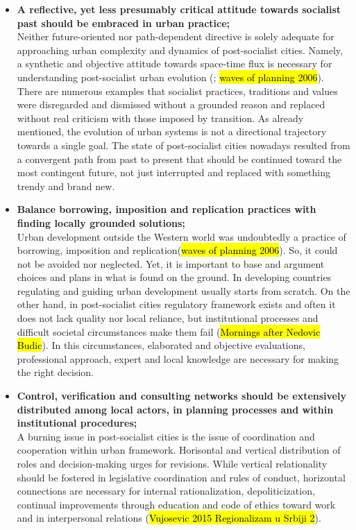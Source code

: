 \documentclass[11pt]{report}
\begin{document}
\begin{itemize}
\item \textbf{A reflective, yet less presumably critical attitude towards socialist past should be embraced in urban practice;}
\\
Neither future-oriented nor path-dependent directive is solely adequate for approaching urban complexity and dynamics of  post-socialist cities. Namely, a synthetic and objective attitude towards space-time flux is necessary for understanding post-socialist urban evolution (\cite{Thomas 1998}; \hl{waves of planning 2006}).
There are numerous examples that socialist practices, traditions and values were disregarded and dismissed without a grounded reason and replaced without real criticism with those imposed by transition.
As already mentioned, the evolution of urban systems is not a directional trajectory towards a single goal.
The state of post-socialist cities nowadays resulted from a convergent path from past to present that should be continued toward the most contingent future, not just interrupted and replaced with something trendy and brand  new.

\item \textbf{Balance borrowing, imposition and replication practices with finding locally grounded solutions;}
\\
Urban development outside the Western world was undoubtedly a practice of borrowing, imposition and replication(\hl{waves of planning 2006}). So, it could not be avoided nor neglected.
Yet, it is important to base and argument choices and plans in what is found on the ground.
In developing countries regulating and guiding urban development usually starts from scratch.
On the other hand,  in post-socialist cities regulatory framework exists and often it does not lack quality nor local reliance, but institutional processes and difficult societal circumstances make them fail (\hl{Mornings after Nedovic Budic}). In this circumstances, elaborated and objective evaluations, professional approach, expert and local knowledge are necessary for making the right decision.

\item \textbf{Control, verification and consulting networks should be extensively distributed among local actors, in planning processes and within institutional procedures;}
\\
A burning issue in post-socialist cities is the issue of coordination and cooperation within urban framework.
Horisontal and vertical distribution of roles and decision-making urges for revisions.
While vertical relationality should be fostered in legislative coordination and rules of conduct, horizontal connections are necessary for internal rationalization, depoliticization, continual improvements through education and code of ethics toward work and in interpersonal relations (\hl{Vujosevic 2015 Regionalizam u Srbiji 2}).
     

\end{itemize}
\end{document}
